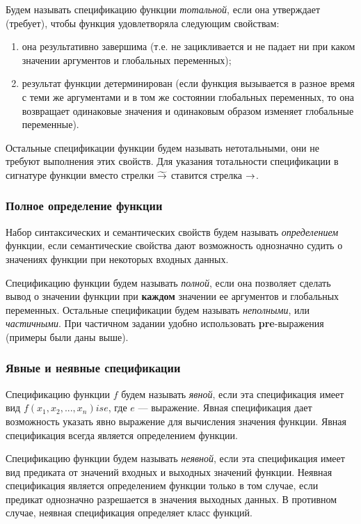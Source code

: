 \documentclass[14pt, twoside]{extreport}
\newcommand{\head}[1]{\vspace{1cm}\subsubsection*{#1}}
\begin{document}
Будем называть спецификацию функции \emph{тотальной}, если она утверждает (требует), чтобы функция удовлетворяла следующим свойствам:
\begin{enumerate}
  \item она результативно завершима (т.е. не зацикливается и не падает ни при каком значении аргументов и глобальных переменных);
  \item результат функции детерминирован (если функция вызывается в разное время с теми же аргументами и в том же состоянии глобальных переменных, то она возвращает одинаковые значения и одинаковым образом изменяет глобальные переменные).
\end{enumerate}

Остальные спецификации функции будем называть нетотальными, они не требуют выполнения этих свойств. Для указания тотальности спецификации в сигнатуре функции вместо стрелки $\widetilde{\rightarrow}$ ставится стрелка $\rightarrow$.

\head{Полное определение функции}

Набор синтаксических и семантических свойств будем называть \emph{определением} функции, если семантические свойства дают возможность однозначно судить о значениях функции при некоторых входных данных.

Спецификацию функции будем называть \emph{полной}, если она позволяет сделать вывод о значении функции при \textbf{каждом} значении ее аргументов и глобальных переменных. Остальные спецификации будем называть \emph{неполными}, или \emph{частичными}. При частичном задании удобно использовать \textbf{pre}-выражения (примеры были даны выше).

\head{Явные и неявные спецификации}

Спецификацию функции $f$ будем называть \emph{явной}, если эта спецификация имеет вид $f(x_1, x_2, ..., x_n) is e$, где $e$ --- выражение. Явная спецификация дает возможность указать явно выражение для вычисления значения функции. Явная спецификация всегда является определением функции.

Спецификацию функции будем называть \emph{неявной}, если эта спецификация имеет вид предиката от значений входных и выходных значений функции. Неявная спецификация является определением функции только в том случае, если предикат однозначно разрешается в значения выходных данных. В противном случае, неявная спецификация определяет класс функций.
\end{document}
